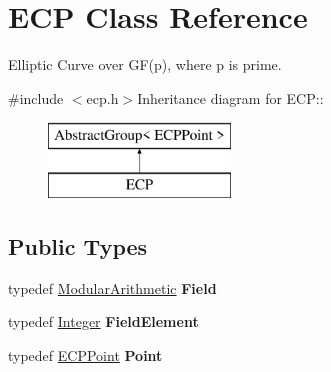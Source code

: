 \hypertarget{class_e_c_p}{
\section{ECP Class Reference}
\label{class_e_c_p}
}


Elliptic Curve over GF(p), where p is prime.  


{\ttfamily \#include $<$ecp.h$>$}Inheritance diagram for ECP::\begin{figure}[H]
\begin{center}
\leavevmode
\includegraphics[height=2cm]{class_e_c_p}
\end{center}
\end{figure}
\subsection*{Public Types}
\begin{DoxyCompactItemize}
\item 
\hypertarget{class_e_c_p_a746aebbc43b99972e5a647ebabbbc931}{
typedef \hyperlink{class_modular_arithmetic}{ModularArithmetic} {\bfseries Field}}
\label{class_e_c_p_a746aebbc43b99972e5a647ebabbbc931}

\item 
\hypertarget{class_e_c_p_a337e68ddf10edab098c55474d52c4d04}{
typedef \hyperlink{class_integer}{Integer} {\bfseries FieldElement}}
\label{class_e_c_p_a337e68ddf10edab098c55474d52c4d04}

\item 
\hypertarget{class_e_c_p_a99c34a437007f32af4e6c4ae275358ea}{
typedef \hyperlink{struct_e_c_p_point}{ECPPoint} {\bfseries Point}}
\label{class_e_c_p_a99c34a437007f32af4e6c4ae275358ea}

\end{DoxyCompactItemize}

